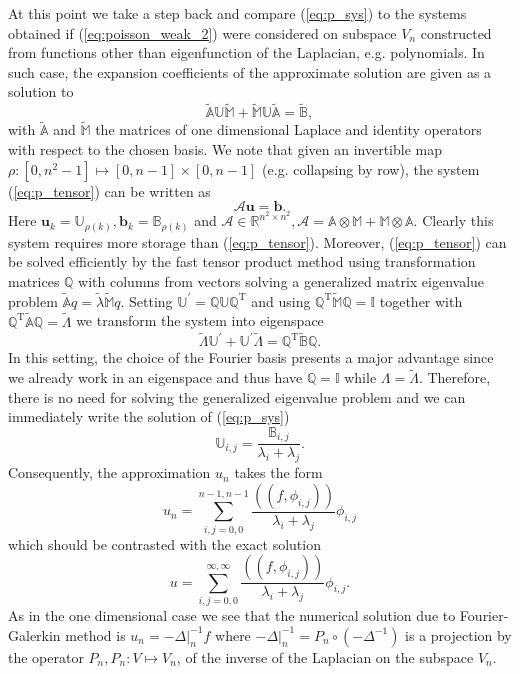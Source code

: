 \documentclass[a4paper,10pt]{article}
\newcommand{\R}{\ensuremath{\mathbb{R}}}
\newcommand{\Inner}[2]{\ensuremath{\left(\left(#1, #2\right)\right)}}
\begin{document}
  At this point we take a step back and compare (\ref{eq:p_sys}) to the systems
  obtained if (\ref{eq:poisson_weak_2}) were considered on subspace $V_n$
  constructed from functions other than eigenfunction of the Laplacian, e.g.
  polynomials. In such case, the expansion coefficients of the approximate
  solution are given as a solution to 
  \begin{equation}
    \label{eq:p_tensor}
    \tilde{\mathbb{A}}\mathbb{U}\tilde{\mathbb{M}} +
    \tilde{\mathbb{M}}\mathbb{U}\tilde{\mathbb{A}} =
    \tilde{\mathbb{B}},
  \end{equation} 
  with $\tilde{\mathbb{A}}$ and $\tilde{\mathbb{M}}$ the matrices of one
  dimensional Laplace and identity operators with respect to the chosen basis.
  We note that given an invertible map 
  $\rho:\left[0, n^2-1\right]\mapsto\left[0, n-1\right]\times\left[0, n-1\right]$
  (e.g. collapsing by row), the system (\ref{eq:p_tensor}) can be written as
  \[
  \mathcal{A}\mathbf{u} = \mathbf{b}.
  \]
  Here $\mathbf{u}_{k}=\mathbb{U}_{\rho(k)}, \mathbf{b}_{k}=\mathbb{B}_{\rho(k)}$
  and $\mathcal{A}\in\R^{n^2\times n^2}, \mathcal{A}=\mathbb{A}\otimes\mathbb{M}
  +\mathbb{M}\otimes\mathbb{A}$. Clearly this system requires more storage than
  (\ref{eq:p_tensor}). Moreover, (\ref{eq:p_tensor}) can be solved efficiently
  by the fast tensor product method using transformation matrices $\mathbb{Q}$
  with columns from vectors solving a generalized matrix eigenvalue problem
  $\tilde{\mathbb{A}}q=\tilde{\lambda}\tilde{\mathbb{M}}q$. Setting 
  $\mathbb{U}^\prime = \mathbb{Q}\mathbb{U}\mathbb{Q}^{\text{T}}$ and using
  $\mathbb{Q}^{\text{T}}\tilde{\mathbb{M}}\mathbb{Q}=\mathbb{I}$ together with
  $\mathbb{Q}^{\text{T}}\tilde{\mathbb{A}}\mathbb{Q}=\tilde{\Lambda}$ we
  transform the system into eigenspace
  \[
    \tilde{\Lambda}\mathbb{U}^{\prime} + \mathbb{U}^{\prime}\tilde{\Lambda} = 
    \mathbb{Q}^{\text{T}}\tilde{\mathbb{B}}\mathbb{Q}.
  \]
  In this setting, the choice of the Fourier basis presents a major advantage
  since we already work in an eigenspace and thus have $\mathbb{Q}=\mathbb{I}$
  while $\Lambda = \tilde{\Lambda}$. Therefore, there is no need for solving the
  generalized eigenvalue problem and we can immediately write the
  solution of (\ref{eq:p_sys})
  \[
    \mathbb{U}_{i, j} = \frac{\mathbb{B}_{i, j}}{\lambda_i + \lambda_j}.
  \]
  Consequently, the approximation $u_n$ takes the form
  \[
    u_n = \sum\limits_{i, j = 0, 0}^{n-1, n-1}\frac{\Inner{f}{\phi_{i, j}}}{\lambda_i + \lambda_j}
    \phi_{i, j}
  \]
  which should be contrasted with the exact solution
  \[
    u = \sum\limits_{i, j = 0, 0}^{\infty, \infty}\frac{\Inner{f}{\phi_{i, j}}}{\lambda_i + \lambda_j}
    \phi_{i, j}.
  \]
  As in the one dimensional case we see that the numerical solution due to
  Fourier-Galerkin method is $u_n = -\Delta|_{n}^{-1}f$ where
  $-\Delta|_{n}^{-1}=P_n \circ \left(-\Delta^{-1}\right)$ is a projection by 
  the operator $P_n, P_n:V\mapsto V_n$, of the inverse of the Laplacian on the
  subspace $V_n$.
\end{document}
